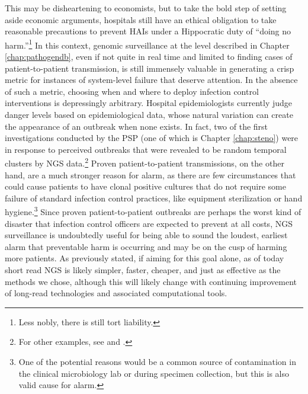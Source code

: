 This may be disheartening to economists, but to take the bold step of setting aside economic arguments, hospitals still have an ethical obligation to take reasonable precautions to prevent HAIs under a Hippocratic duty of ``doing no harm.''\footnote{Less nobly, there is still tort liability.} In this context, genomic surveillance at the level described in Chapter \ref{chap:pathogendb}, even if not quite in real time and limited to finding cases of patient-to-patient transmission, is still immensely valuable in generating a crisp metric for instances of system-level failure that deserve attention. In the absence of such a metric, choosing when and where to deploy infection control interventions is depressingly arbitrary. Hospital epidemiologists currently judge danger levels based on epidemiological data, whose natural variation can create the appearance of an outbreak when none exists. In fact, two of the first investigations conducted by the PSP (one of which is Chapter \ref{chap:steno}) were in response to perceived outbreaks that were revealed to be random temporal clusters by NGS data.\footnote{For other examples, see \textcite{Peaper2015} and \textcite{Anderson2014}.} Proven patient-to-patient transmissions, on the other hand, are a much stronger reason for alarm, as there are few circumstances that could cause patients to have clonal positive cultures that do not require some failure of standard infection control practices, like equipment sterilization or hand hygiene.\footnote{One of the potential reasons would be a common source of contamination in the clinical microbiology lab or during specimen collection, but this is also valid cause for alarm.} Since proven patient-to-patient outbreaks are perhaps the worst kind of disaster that infection control officers are expected to prevent at all costs, NGS surveillance is undoubtedly useful for being able to sound the loudest, earliest alarm that preventable harm is occurring and may be on the cusp of harming more patients. As previously stated, if aiming for this goal alone, as of today short read NGS is likely simpler, faster, cheaper, and just as effective as the methods we chose, although this will likely change with continuing improvement of long-read technologies and associated computational tools.

